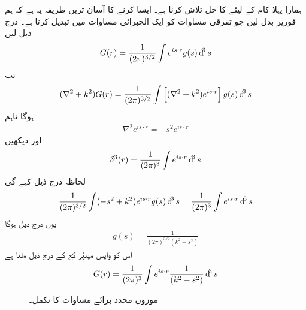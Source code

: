 ہمارا پہلا کام  کے لیئے  کا حل تلاش کرنا ہے۔ ایسا کرنے کا آسان ترین طریقہ یہ ہے کہ ہم فوریر بدل لیں جو تفرقی مساوات کو ایک الجبرائی مساوات میں تبدیل کرتا ہے۔ درج ذیل لیں
\begin{align}
	G(r)=\frac{1}{(2\pi)^{3/2}}\int e^{is\cdot r}g(s)\dif^3s
\end{align}
تب 
\begin{align*}
	(\nabla^2+k^2)G(r) = \frac{1}{(2\pi)^{3/2}}\int\left[(\nabla^2+k^2)e^{is\cdot r}\right]g(s)\dif^3s
\end{align*}
ہوگا تاہم
\begin{align}
	\nabla^2e^{is\cdot r} = -s^2 e^{is\cdot r}
\end{align}
اور  دیکھیں
\begin{align}
	\delta^3(r)=\frac{1}{(2\pi)^3}\int e^{is\cdot r}\dif^3s
\end{align}
لحاظہ  درج ذیل کہے گی
\begin{align*}
	\frac{1}{(2\pi)^{3/2}}\int(-s^2+k^2)e^{is\cdot r}g(s)\dif^3s = \frac{1}{(2\pi)^3}\int e^{is\cdot r}\dif^3s
\end{align*}
یوں درج ذیل ہوگا 
\begin{align}
	g(s) = \frac{1}{(2\pi)^{3/2}(k^2-s^2)}
\end{align}
اس کو واپس  میںپُر کع کے درج ذیل ملتا ہے
\begin{align}\label{مساوات_بکھراو_گرین_کا_تکمل}
	G(r) = \frac{1}{(2\pi)^3}\int e^{is\cdot r}\frac{1}{(k^2-s^2)}\dif^3s
\end{align}
%
\begin{figure}
\centering
{}
\caption{موزوں محدد برائے مساوات   کا تکمل۔}
\label{شکل_بکھراو_موزوں_محدد}
\end{figure}

